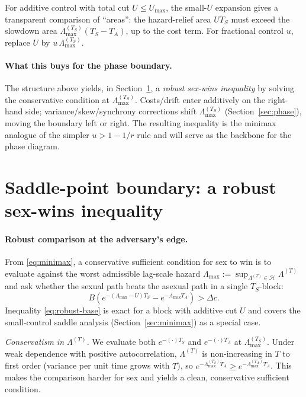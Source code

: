 \documentclass[11pt]{article}
\theoremstyle{upright}
\newcommand{\horizon}{\Lambda}
\newcommand{\Lmax}{\horizon^{(T)}_{\max}}
\newcommand{\Hset}{\mathcal{H}}
\newcommand{\hazT}[1]{\Lambda^{(#1)}}          %
\renewcommand{\Lmax}{\Lambda_{\max}}
\begin{document}
For additive control with total cut $U\le U_{\max}$, the small-$U$ expansion gives a transparent comparison of “areas”: the hazard-relief area $U T_S$ must exceed the slowdown area $\Lambda_{\max}^{(T_S)}(T_S-T_A)$, up to the cost term. For fractional control $u$, replace $U$ by $u\,\Lambda_{\max}^{(T_S)}$.

\paragraph{What this buys for the phase boundary.}
The structure above yields, in Section~\ref{sec:saddle}, a \emph{robust sex-wins inequality} by solving the conservative condition at $\Lambda_{\max}^{(T_S)}$. Costs/drift enter additively on the right-hand side; variance/skew/synchrony corrections shift $\Lambda_{\max}^{(T_S)}$ (Section~\ref{sec:phase}), moving the boundary left or right. The resulting inequality is the minimax analogue of the simpler $u>1-1/r$ rule and will serve as the backbone for the phase diagram.


\section{Saddle-point boundary: a robust sex-wins inequality}
\label{sec:saddle}

\paragraph{Robust comparison at the adversary’s edge.}
From \eqref{eq:minimax}, a conservative sufficient condition for sex to win is to evaluate against the worst admissible lag-scale hazard $\Lmax:=\sup_{\hazT{T}\in\Hset}\hazT{T}$ and ask whether the sexual path beats the asexual path in a single $T_S$-block:
\begin{equation}
\label{eq:robust-base}
B\left(e^{-(\Lmax-U)T_S}-e^{-\Lmax T_A}\right)>\Delta c.
\end{equation}
Inequality \eqref{eq:robust-base} is exact for a block with additive cut $U$ and covers the small-control saddle analysis (Section~\ref{sec:minimax}) as a special case.

\noindent\emph{Conservatism in $\hazT{T}$.}
We evaluate both $e^{-(\cdot)T_S}$ and $e^{-(\cdot)T_A}$ at $\Lambda^{(T_S)}_{\max}$.
Under weak dependence with positive autocorrelation, $\hazT{T}$ is non-increasing in $T$ to first order
(variance per unit time grows with $T$), so
$e^{-\Lambda^{(T_S)}_{\max} T_A}\ge e^{-\Lambda^{(T_A)}_{\max} T_A}$.
This makes the comparison harder for sex and yields a clean, conservative sufficient condition.
\end{document}
